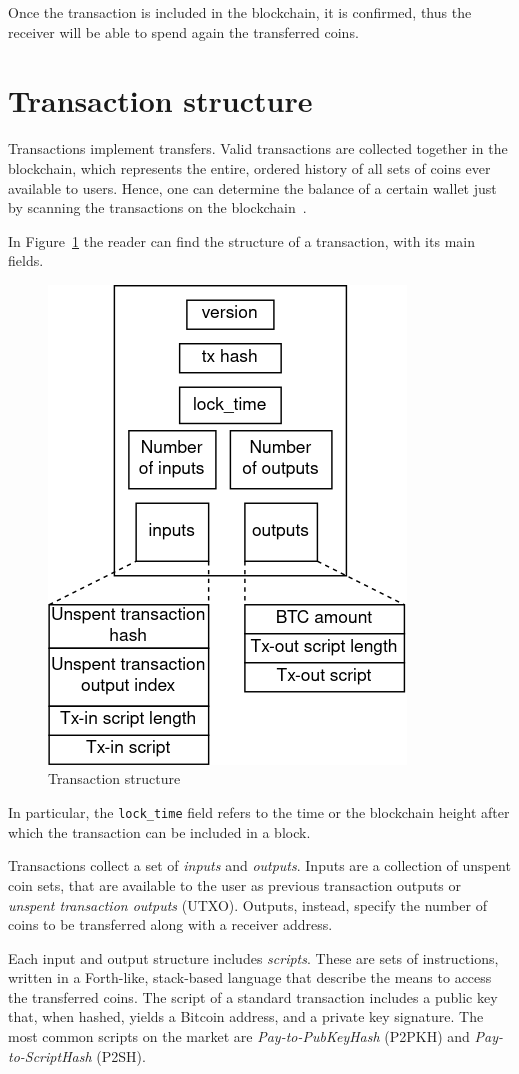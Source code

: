 Once the transaction is included in the blockchain, it is confirmed, thus the receiver will be able to spend again the transferred coins.

\section{Transaction structure}\label{sec:tx}
Transactions implement transfers. Valid transactions are collected together in the blockchain, which represents the entire, ordered history of all sets of coins ever available to users. Hence, one can determine the balance of a certain wallet just by scanning the transactions on the blockchain~\cite{tschorsch-intro-survey}.

In Figure~\ref{fig:tx} the reader can find the structure of a transaction, with its main fields.

\begin{figure}[h]
	\includegraphics[width=.40\textwidth]{pict/txstruct.png}
	\centering
	\caption{Transaction structure}
	\label{fig:tx}
\end{figure}

In particular, the \texttt{lock\_time} field refers to the time or the blockchain height after which the transaction can be included in a block.

Transactions collect a set of \emph{inputs} and \emph{outputs}. Inputs are a collection of unspent coin sets, that are available to the user as previous transaction outputs or \textit{unspent transaction outputs} (UTXO). Outputs, instead, specify the number of coins to be transferred along with a receiver address.

Each input and output structure includes \emph{scripts}. These are sets of instructions, written in a Forth-like, stack-based language that describe the means to access the transferred coins. The script of a standard transaction includes a public key that, when hashed, yields a Bitcoin address, and a private key signature. The most common scripts on the market are \emph{Pay-to-PubKeyHash} (P2PKH) and \emph{Pay-to-ScriptHash} (P2SH).

